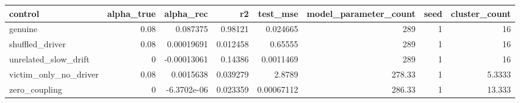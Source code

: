 \begin{tabular}{lrrrrrrr}
\toprule
control & alpha\_true & alpha\_rec & r2 & test\_mse & model\_parameter\_count & seed & cluster\_count \\
\midrule
genuine & 0.08 & 0.087375 & 0.98121 & 0.024665 & 289 & 1 & 16 \\
shuffled\_driver & 0.08 & 0.00019691 & 0.012458 & 0.65555 & 289 & 1 & 16 \\
unrelated\_slow\_drift & 0 & -0.00013061 & 0.14386 & 0.0011469 & 289 & 1 & 16 \\
victim\_only\_no\_driver & 0.08 & 0.0015638 & 0.039279 & 2.8789 & 278.33 & 1 & 5.3333 \\
zero\_coupling & 0 & -6.3702e-06 & 0.023359 & 0.00067112 & 286.33 & 1 & 13.333 \\
\bottomrule
\end{tabular}
